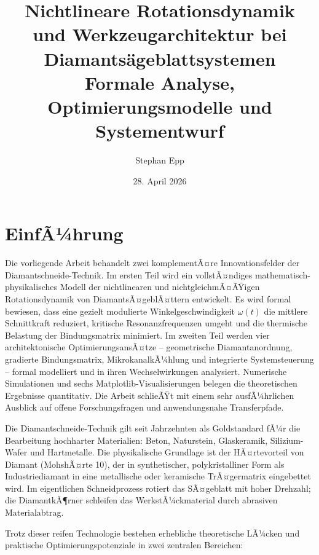 ﻿\documentclass[a4paper,12pt]{article}
\title{\textbf{Nichtlineare Rotationsdynamik und Werkzeugarchitektur bei Diamants{\"a}geblattsystemen}\\[0.1em]
\large Formale Analyse, Optimierungsmodelle und Systementwurf}
\author{Stephan Epp}
\date{28. April 2026}
\theoremstyle{definition}
\begin{document}
\maketitle
\tableofcontents
\newpage

\section{EinfÃ¼hrung}
Die vorliegende Arbeit behandelt zwei komplementÃ¤re Innovationsfelder der Diamantschnei\-de-Technik.
Im ersten Teil wird ein vollstÃ¤ndiges mathematisch-physikalisches Modell der nichtlinearen und
nichtgleichmÃ¤ÃŸigen Rotationsdynamik von DiamantsÃ¤geblÃ¤ttern entwickelt. Es wird formal
bewiesen, dass eine gezielt modulierte Winkelgeschwindigkeit $\omega(t)$ die mittlere Schnittkraft
reduziert, kritische Resonanzfrequenzen umgeht und die thermische Belastung der Bindungsmatrix
minimiert. Im zweiten Teil werden vier architektonische OptimierungsansÃ¤tze -- geometrische
Diamantanordnung, gradierte Bindungsmatrix, MikrokanalkÃ¼hlung und integrierte Systemsteuerung --
formal modelliert und in ihren Wechselwirkungen analysiert. Numerische Simulationen und sechs
Matplotlib-Visualisierungen belegen die theoretischen Ergebnisse quantitativ.
Die Arbeit schlieÃŸt mit einem sehr ausfÃ¼hrlichen Ausblick auf offene Forschungsfragen und
anwendungsnahe Transferpfade.

Die Diamantschneide-Technik gilt seit Jahrzehnten als Goldstandard fÃ¼r die Bearbeitung
hochharter Materialien: Beton, Naturstein, Glaskeramik, Silizium-Wafer und Hartmetalle.
Die physikalische Grundlage ist der HÃ¤rtevorteil von Diamant (MohshÃ¤rte 10), der in synthetischer, 
polykristalliner Form als Industriediamant in eine metallische
oder keramische TrÃ¤germatrix eingebettet wird. Im eigentlichen Schneidprozess rotiert
das SÃ¤geblatt mit hoher Drehzahl; die DiamantkÃ¶rner schleifen das WerkstÃ¼ckmaterial
durch abrasiven Materialabtrag.

Trotz dieser reifen Technologie bestehen erhebliche theoretische LÃ¼cken und praktische
Optimierungspotenziale in zwei zentralen Bereichen:
\end{document}
